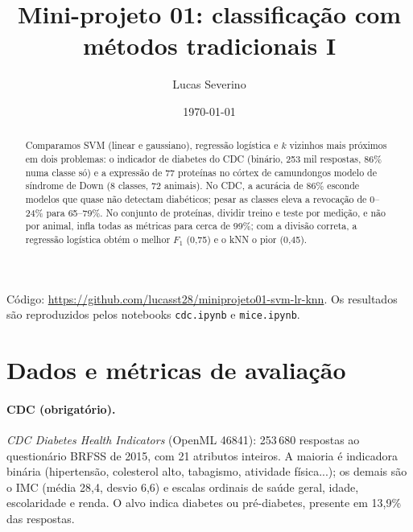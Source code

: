 \documentclass[aps,pre,twocolumn,10pt,nofootinbib]{revtex4-2}
\begin{document}
\title{Mini-projeto 01: classificação com métodos tradicionais I}
\author{Lucas Severino}
\date{\today}
\begin{abstract}
Comparamos SVM (linear e gaussiano), regressão logística e $k$ vizinhos mais
próximos em dois problemas: o indicador de diabetes do CDC (binário, 253 mil
respostas, 86\% numa classe só) e a expressão de 77 proteínas no córtex de
camundongos modelo de síndrome de Down (8 classes, 72 animais). No CDC, a
acurácia de 86\% esconde modelos que quase não detectam diabéticos; pesar as
classes eleva a revocação de 0--24\% para 65--79\%. No conjunto de proteínas,
dividir treino e teste por medição, e não por animal, infla todas as métricas
para cerca de 99\%; com a divisão correta, a regressão logística obtém o
melhor $F_1$ (0,75) e o kNN o pior (0,45).
\end{abstract}
\maketitle

Código: \url{https://github.com/lucasst28/miniprojeto01-svm-lr-knn}. Os
resultados são reproduzidos pelos notebooks \texttt{cdc.ipynb} e
\texttt{mice.ipynb}.

\section{Dados e métricas de avaliação}

\paragraph{CDC (obrigatório).}
\textit{CDC Diabetes Health Indicators} (OpenML 46841): 253\,680 respostas
ao questionário BRFSS de 2015, com 21 atributos inteiros. A maioria é
indicadora binária (hipertensão, colesterol alto, tabagismo, atividade
física...); os demais são o IMC (média 28,4, desvio 6,6) e escalas ordinais
de saúde geral, idade, escolaridade e renda. O alvo indica diabetes ou
pré-diabetes, presente em 13,9\% das respostas.
\end{document}
